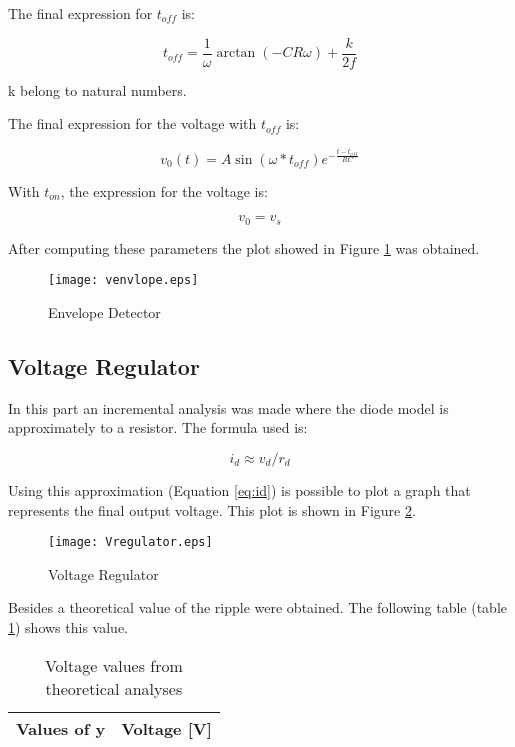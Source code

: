 The final expression for $t_{off}$ is:

\begin{equation}
   t_{off}=\frac{1}{\omega } \arctan (-CR\omega ) + \frac{k}{2f} 
\end{equation}

k belong to natural numbers.

The final expression for the voltage with $t_{off}$ is:

\begin{equation}
  v_0(t)=A\sin (\omega*t_{off})e^{-\frac{t-t_{off}}{RC}} 
\end{equation}

With $t_{on}$, the expression for the voltage is:

\begin{equation}
    v_{0}= v_s
\end{equation}

After computing these parameters the plot showed in Figure \ref{fig:venvlope}  was obtained.

\begin{figure}[ht] \centering
\texttt{[image: venvlope.eps]}
\caption{Envelope Detector}
\label{fig:venvlope}
\end{figure}


\subsection{Voltage Regulator}

In this part an incremental analysis was made where the diode model is approximately to a resistor. The formula used is:

\begin{equation}
    i_d \approx v_d / r_d
    \label{eq:id}
\end{equation}

Using this approximation (Equation \ref{eq:id}) is possible to plot a graph that represents the final output voltage. This plot is shown in Figure \ref{fig:Vregulator}.

\begin{figure}[h] \centering
\texttt{[image: Vregulator.eps]}
\caption{Voltage Regulator}
\label{fig:Vregulator}
\end{figure}

Besides a theoretical value of the ripple were obtained. The following table (table \ref{tab:ripple_tab}) shows this value.

\begin{table}[h]
  \centering
  \begin{tabular}{|l|r|}
    \hline    
    {\bf Values of y} & {\bf Voltage [V]} \\ \hline
    
  \end{tabular}
  \caption{Voltage values from theoretical analyses}
  \label{tab:ripple_tab}
\end{table}

